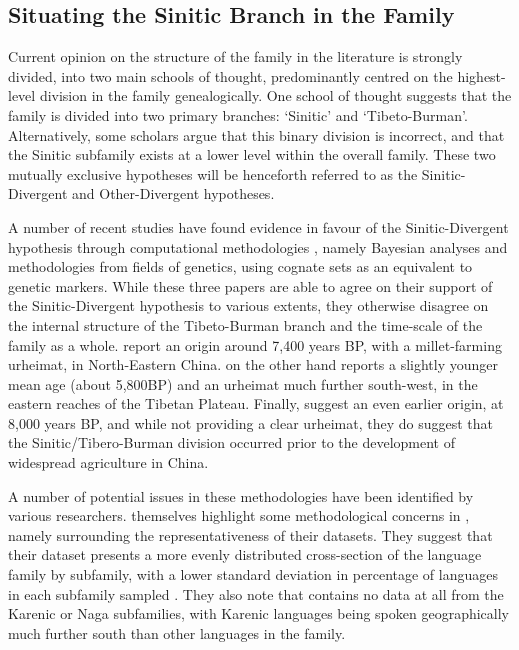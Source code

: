 \subsection{Situating the Sinitic Branch in the Family}\label{ss:THOverview:HighLevelStructure}

Current opinion on the structure of the family in the literature is strongly divided, into two main schools of thought, predominantly centred on the highest-level division in the family genealogically. One school of thought suggests that the family is divided into two primary branches: `Sinitic' and `Tibeto-Burman'. Alternatively, some scholars argue that this binary division is incorrect, and that the Sinitic subfamily exists at a lower level within the overall family. These two mutually exclusive hypotheses will be henceforth referred to as the Sinitic-Divergent and Other-Divergent hypotheses.

A number of recent studies have found evidence in favour of the Sinitic-Divergent hypothesis through computational methodologies \cites{ZhangM2019Baye}{ZhangH2020Baye}{Sagart2019Baye}, namely Bayesian analyses and methodologies from fields of genetics, using cognate sets as an equivalent to genetic markers. While these three papers are able to agree on their support of the Sinitic-Divergent hypothesis to various extents, they otherwise disagree on the internal structure of the Tibeto-Burman branch and the time-scale of the family as a whole.  report an origin around 7,400 years BP, with a millet-farming urheimat, in North-Eastern China.  on the other hand reports a slightly younger mean age (about 5,800BP) and an urheimat much further south-west, in the eastern reaches of the Tibetan Plateau. Finally,   suggest an even earlier origin, at 8,000 years BP, and while not providing a clear urheimat, they do suggest that the Sinitic/Tibero-Burman division occurred prior to the development of widespread agriculture in China.

A number of potential issues in these methodologies have been identified by various researchers.  themselves highlight some methodological concerns in , namely surrounding the representativeness of their datasets. They suggest that their dataset presents a more evenly distributed cross-section of the language family by subfamily, with a lower standard deviation in percentage of languages in each subfamily sampled \cite{ZhangH2020Baye}. They also note that  contains no data at all from the Karenic or Naga subfamilies, with Karenic languages being spoken geographically much further south than other languages in the family.

